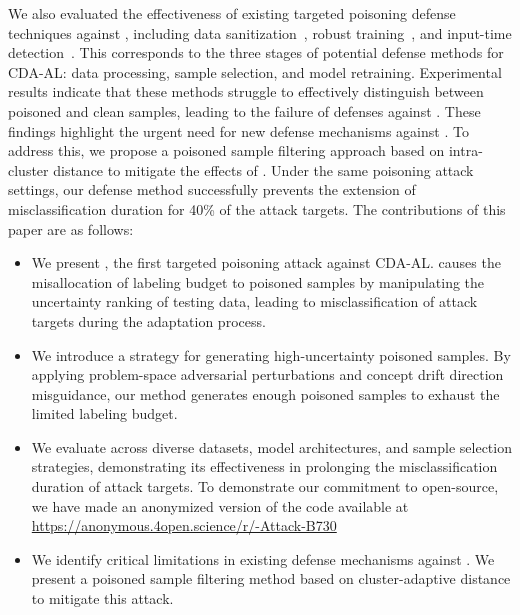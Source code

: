 We also evaluated the effectiveness of existing targeted poisoning defense techniques against \pandora, including data sanitization~\cite{chen2018detecting}, robust training~\cite{DFP}, and input-time detection~\cite{2023-ICCV-Trigger-Detect}.
This corresponds to the three stages of potential defense methods for CDA-AL: data processing, sample selection, and model retraining.
Experimental results indicate that these methods struggle to effectively distinguish between poisoned and clean samples, leading to the failure of defenses against \pandora.
These findings highlight the urgent need for new defense mechanisms against \pandora.
To address this, we propose a poisoned sample filtering approach based on intra-cluster distance to mitigate the effects of \pandora.
Under the same poisoning attack settings, our defense method successfully prevents the extension of misclassification duration for 40\% of the attack targets.
The contributions of this paper are as follows:
\begin{itemize}
	\item We present \pandora, the first targeted poisoning attack against CDA-AL.
	\pandora causes the misallocation of labeling budget to poisoned samples by manipulating the uncertainty ranking of testing data, leading to misclassification of attack targets during the adaptation process.
	
	\item We introduce a strategy for generating high-uncertainty poisoned samples.
	By applying problem-space adversarial perturbations and concept drift direction misguidance, our method generates enough poisoned samples to exhaust the limited labeling budget.
	
	\item We evaluate \pandora across diverse datasets, model architectures, and sample selection strategies, demonstrating its effectiveness in prolonging the misclassification duration of attack targets.
	To demonstrate our commitment to open-source, we have made an anonymized version of the code available at \href{https://anonymous.4open.science/r/\pandora-Attack-B730}{https://anonymous.4open.science/r/\pandora-Attack-B730} 
	
	\item We identify critical limitations in existing defense mechanisms against \pandora.
	We present a poisoned sample filtering method based on cluster-adaptive distance to mitigate this attack.
\end{itemize}

